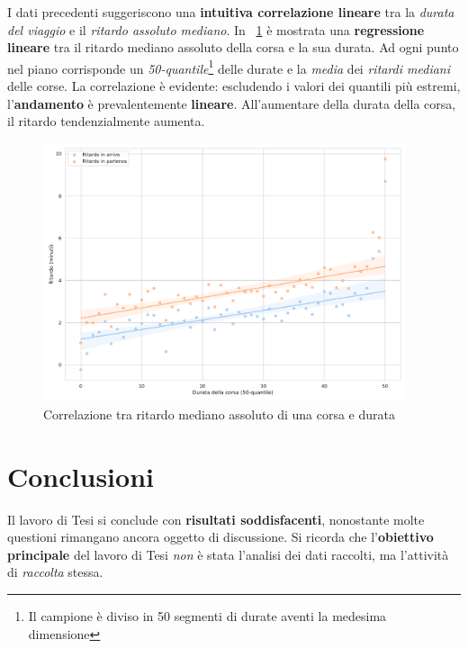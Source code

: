\documentclass[12pt,italian]{report}
\begin{document}
I dati precedenti suggeriscono una \textbf{intuitiva correlazione
    lineare} tra la \textit{durata del viaggio} e il \textit{ritardo
    assoluto mediano}.  In
\figurename~\ref{figure:delay_duration_corr} è mostrata una
\textbf{regressione lineare} tra il ritardo mediano assoluto della
corsa e la sua durata.  Ad ogni punto nel piano corrisponde un
\textit{50-quantile}\footnote{Il campione è diviso in 50 segmenti di
    durate aventi la medesima dimensione} delle durate e la
\textit{media} dei \textit{ritardi mediani} delle corse.  La
correlazione è evidente: escludendo i valori dei quantili più estremi,
l'\textbf{andamento} è prevalentemente \textbf{lineare}.
All'aumentare della durata della corsa, il ritardo tendenzialmente
aumenta.

\begin{figure}[t]
    \includegraphics[width=0.95\textwidth]{images/delay_duration_corr.pdf}
    \caption{Correlazione tra ritardo mediano assoluto di una corsa e
        durata~\cite[K]{StatJup}}
    \label{figure:delay_duration_corr}
\end{figure}

\chapter{Conclusioni}

Il lavoro di Tesi si conclude con \textbf{risultati soddisfacenti},
nonostante molte questioni rimangano ancora oggetto di discussione.
Si ricorda che l'\textbf{obiettivo principale} del lavoro di Tesi
\textit{non} è stata l'analisi dei dati raccolti, ma l'attività di
\textit{raccolta} stessa.
\end{document}
